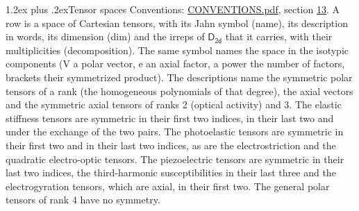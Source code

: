 \documentclass[10pt,a4paper]{article}
\makeatletter
\renewcommand\section{\@startsection{section}{1}{\z@}{-3ex plus -1ex minus -.2ex}%
  {1.2ex plus .2ex}{\normalfont\large\sffamily\bfseries\color{parttitle}}}
\numberwithin{equation}{section}
\newcommand{\grp}[1]{\mathsf{#1}}
\makeatother
\begin{document}
\section{Tensor spaces}\label{s:tensor_spaces}
Conventions: \href{../../CONVENTIONS.pdf}{CONVENTIONS.pdf}, section \href{../../CONVENTIONS.pdf\#conv.13}{13}.
\leavevmode\label{n:head.name}\label{n:head.description}\label{n:head.dim}\label{n:head.decomposition}A row is a space of Cartesian tensors, with its Jahn symbol (name), its description in words, its dimension (dim) and the irreps of $\grp{D_{2d}}$ that it carries, with their multiplicities (decomposition). \label{n:label.jahn}The same symbol names the space in the isotypic components (V a polar vector, e an axial factor, a power the number of factors, brackets their symmetrized product). The descriptions name the symmetric polar tensors of a rank (the homogeneous polynomials of that degree), the axial vectors and the symmetric axial tensors of ranks 2 (optical activity) and 3. The elastic stiffness tensors are symmetric in their first two indices, in their last two and under the exchange of the two pairs. The photoelastic tensors are symmetric in their first two and in their last two indices, as are the electrostriction and the quadratic electro-optic tensors. The piezoelectric tensors are symmetric in their last two indices, the third-harmonic susceptibilities in their last three and the electrogyration tensors, which are axial, in their first two. The general polar tensors of rank 4 have no symmetry.
\end{document}
